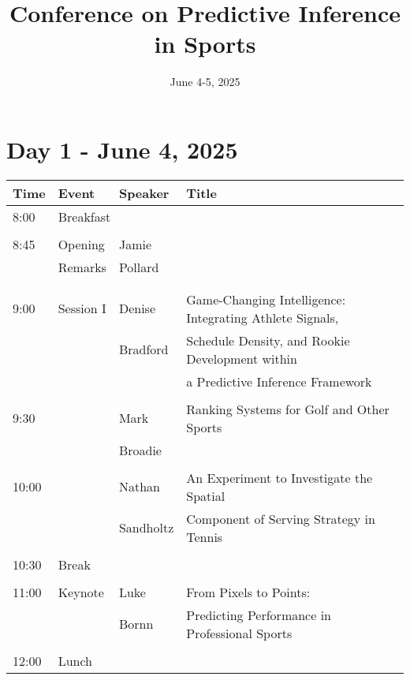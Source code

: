 \documentclass[12pt]{article}
\title{Conference on Predictive Inference in Sports}
\author{}
\date{June 4-5, 2025}
\begin{document}


\newpage

\section*{Day 1 - June 4, 2025}

\vspace{0.2in} 

\begin{tabular}{l|l|l|l}
Time & Event & Speaker & Title \\
\hline
8:00 & \multicolumn{3}{|l}{Breakfast} \\
\hline
& & & \\
8:45 & Opening & Jamie & \\
& Remarks & Pollard & \\
& & & \\
\hline
& & & \\
9:00 & Session I & Denise 
    & Game-Changing Intelligence: Integrating Athlete Signals,   \\
& & Bradford & Schedule Density, and Rookie Development within \\
& & & a Predictive Inference Framework \\
& & & \\
9:30 &  & Mark  
    & Ranking Systems for Golf and Other Sports \\
& & Broadie & \\
& & & \\
10:00 &  & Nathan  
    & An Experiment to Investigate the Spatial \\
& & Sandholtz & Component of Serving Strategy in Tennis \\
& & & \\
\hline
10:30 & \multicolumn{3}{|l}{Break} \\
\hline
& & & \\
11:00 & Keynote & Luke 
& From Pixels to Points: \\
& & Bornn & Predicting Performance in Professional Sports \\
& & & \\
\hline
12:00 & \multicolumn{3}{|l}{Lunch} \\

\end{tabular}
\end{document}
